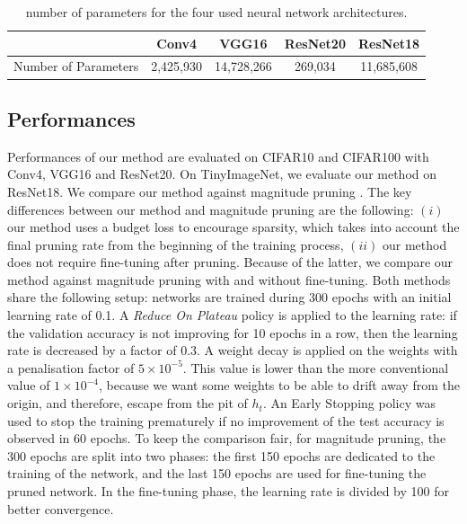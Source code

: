 \begin{table}[ht]
  \centering
  \begin{tabular}{lcccc}
  \cline{2-5}
                       & \textbf{Conv4}     & \textbf{VGG16}      & \textbf{ResNet20} & \textbf{ResNet18}   \\ \hline
  Number of Parameters & 2,425,930 & 14,728,266 & 269,034  & 11,685,608 \\ \hline
  \end{tabular}
  \caption{ number of parameters for the four used neural network architectures.}
  \label{tab:chap1:networks_size}
\end{table}


\subsection{Performances}
\label{sec:chap1:performances}
Performances of our method are evaluated on CIFAR10 and CIFAR100 with Conv4,
VGG16 and ResNet20. On TinyImageNet, we evaluate our method on ResNet18. We
compare our method against magnitude pruning \cite{DBLP:conf/nips/HanPTD15}. The
key differences between our method and magnitude pruning are the following:
$(i)$ our method uses a budget loss to encourage sparsity, which takes into
account the final pruning rate from the beginning of the training process,
$(ii)$ our method does not require fine-tuning after pruning. Because of the
latter, we compare our method against magnitude pruning with and without
fine-tuning. Both methods share the following setup: networks are trained during
300 epochs with an initial learning rate of 0.1. A {\em Reduce On Plateau}
policy is applied to the learning rate: if the validation accuracy is not
improving for 10 epochs in a row, then the learning rate is decreased by a
factor of 0.3. A weight decay is applied on the weights with a penalisation
factor of $5\times10^{−5}$. This value is lower than the more conventional value
of $1\times10^{-4}$, because we want some weights to be able to drift away from the
origin, and therefore, escape from the pit of $h_t$. An Early Stopping policy was
used to stop the training prematurely if no improvement of the test accuracy is
observed in 60 epochs. To keep the comparison fair, for magnitude pruning, the
300 epochs are split into two phases: the first 150 epochs are dedicated to the
training of the network, and the last 150 epochs are used for fine-tuning the
pruned network. In the fine-tuning phase, the learning rate is divided by 100
for better convergence. \\

